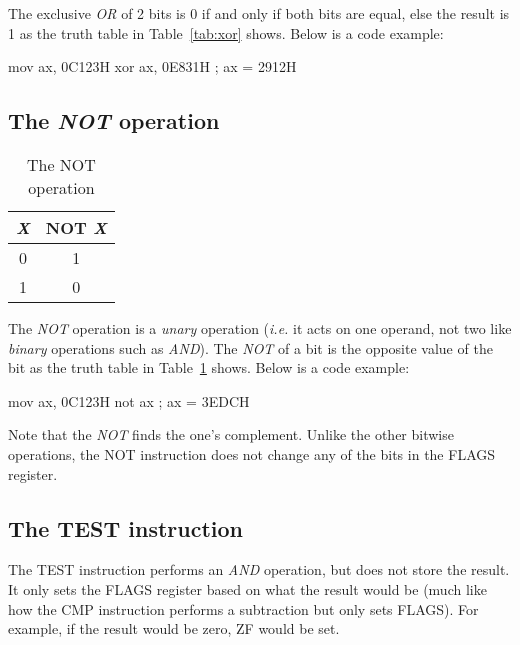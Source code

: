 The exclusive \emph{OR} of 2 bits is 0 if and only if both bits
are equal, else the result is 1 as the truth table in
Table~\ref{tab:xor} shows. Below is a code example:

\begin{AsmCodeListing}[frame=none]
      mov    ax, 0C123H
      xor    ax, 0E831H          ; ax = 2912H
\end{AsmCodeListing}

\subsection{The \emph{NOT} operation}

\begin{table}[t]
\centering
\begin{tabular}{|c|c|}
\hline
\emph{X} & NOT \emph{X} \\
\hline \hline
0 & 1 \\
1 & 0 \\
\hline
\end{tabular}
\caption{The NOT operation \label{tab:not}}
\end{table}

The \emph{NOT} operation is a \emph{unary} operation (\emph{i.e.} it
acts on one operand, not two like \emph{binary} operations such as
\emph{AND}).  The \emph{NOT} of a bit is the opposite value of the bit
as the truth table in Table~\ref{tab:not} shows. Below is a code
example:

\begin{AsmCodeListing}[frame=none]
      mov    ax, 0C123H
      not    ax                 ; ax = 3EDCH
\end{AsmCodeListing}

Note that the \emph{NOT} finds the one's complement. Unlike the other
bitwise operations, the {\code NOT} instruction does not change any of
the bits in the {\code FLAGS} register.

\subsection{The {\code TEST} instruction}

The {\code TEST} instruction performs an \emph{AND} operation, but
does not store the result. It only sets the {\code FLAGS} register
based on what the result would be (much like how the {\code CMP}
instruction performs a subtraction but only sets {\code FLAGS}). For
example, if the result would be zero, {\code ZF} would be set.

